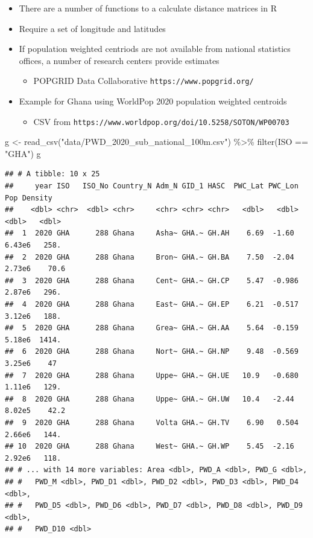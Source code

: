 \documentclass[
]{book}
\newenvironment{Shaded}{\begin{snugshade}}{\end{snugshade}}
\newcommand{\FunctionTok}[1]{\textcolor[rgb]{0.00,0.00,0.00}{#1}}
\newcommand{\NormalTok}[1]{#1}
\newcommand{\OtherTok}[1]{\textcolor[rgb]{0.56,0.35,0.01}{#1}}
\newcommand{\SpecialCharTok}[1]{\textcolor[rgb]{0.00,0.00,0.00}{#1}}
\newcommand{\StringTok}[1]{\textcolor[rgb]{0.31,0.60,0.02}{#1}}
\providecommand{\tightlist}{%
  \setlength{\itemsep}{0pt}\setlength{\parskip}{0pt}}
\begin{document}
\begin{itemize}
\tightlist
\item
  There are a number of functions to a calculate distance matrices in R
\item
  Require a set of longitude and latitudes
\item
  If population weighted centriods are not available from national statistics offices, a number of research centers provide estimates

  \begin{itemize}
  \tightlist
  \item
    POPGRID Data Collaborative \texttt{https://www.popgrid.org/}
  \end{itemize}
\item
  Example for Ghana using WorldPop 2020 population weighted centroids

  \begin{itemize}
  \tightlist
  \item
    CSV from \texttt{https://www.worldpop.org/doi/10.5258/SOTON/WP00703}
  \end{itemize}
\end{itemize}

\begin{Shaded}
\begin{Highlighting}[]
\NormalTok{g }\OtherTok{\textless{}{-}} \FunctionTok{read\_csv}\NormalTok{(}\StringTok{"data/PWD\_2020\_sub\_national\_100m.csv"}\NormalTok{) }\SpecialCharTok{\%\textgreater{}\%}
  \FunctionTok{filter}\NormalTok{(ISO }\SpecialCharTok{==} \StringTok{"GHA"}\NormalTok{)}
\NormalTok{g}
\end{Highlighting}
\end{Shaded}

\begin{verbatim}
## # A tibble: 10 x 25
##     year ISO   ISO_No Country_N Adm_N GID_1 HASC  PWC_Lat PWC_Lon    Pop Density
##    <dbl> <chr>  <dbl> <chr>     <chr> <chr> <chr>   <dbl>   <dbl>  <dbl>   <dbl>
##  1  2020 GHA      288 Ghana     Asha~ GHA.~ GH.AH    6.69  -1.60  6.43e6   258. 
##  2  2020 GHA      288 Ghana     Bron~ GHA.~ GH.BA    7.50  -2.04  2.73e6    70.6
##  3  2020 GHA      288 Ghana     Cent~ GHA.~ GH.CP    5.47  -0.986 2.87e6   296. 
##  4  2020 GHA      288 Ghana     East~ GHA.~ GH.EP    6.21  -0.517 3.12e6   188. 
##  5  2020 GHA      288 Ghana     Grea~ GHA.~ GH.AA    5.64  -0.159 5.18e6  1414. 
##  6  2020 GHA      288 Ghana     Nort~ GHA.~ GH.NP    9.48  -0.569 3.25e6    47  
##  7  2020 GHA      288 Ghana     Uppe~ GHA.~ GH.UE   10.9   -0.680 1.11e6   129. 
##  8  2020 GHA      288 Ghana     Uppe~ GHA.~ GH.UW   10.4   -2.44  8.02e5    42.2
##  9  2020 GHA      288 Ghana     Volta GHA.~ GH.TV    6.90   0.504 2.66e6   144. 
## 10  2020 GHA      288 Ghana     West~ GHA.~ GH.WP    5.45  -2.16  2.92e6   118. 
## # ... with 14 more variables: Area <dbl>, PWD_A <dbl>, PWD_G <dbl>,
## #   PWD_M <dbl>, PWD_D1 <dbl>, PWD_D2 <dbl>, PWD_D3 <dbl>, PWD_D4 <dbl>,
## #   PWD_D5 <dbl>, PWD_D6 <dbl>, PWD_D7 <dbl>, PWD_D8 <dbl>, PWD_D9 <dbl>,
## #   PWD_D10 <dbl>
\end{verbatim}
\end{document}
